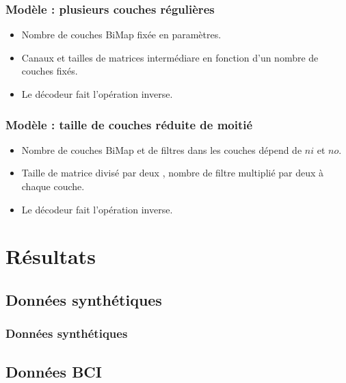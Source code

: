\documentclass{beamer}
\begin{document}
\begin{frame}
\frametitle{Modèle : plusieurs couches régulières}
\begin{itemize}
    \item Nombre de couches BiMap fixée en paramètres.
    \item Canaux et tailles de matrices intermédiare en fonction d'un nombre de couches fixés.
    \item Le décodeur fait l'opération inverse.
\end{itemize}
\begin{center}
    {\tiny
    
    }
\end{center}
\end{frame}

\begin{frame}
\frametitle{Modèle : taille de couches réduite de moitié}
\begin{itemize}
    \item Nombre de couches BiMap et de filtres dans les couches dépend de $ni$ et $no$.
    \item Taille de matrice divisé par deux , nombre de filtre multiplié par deux à chaque couche.
    \item Le décodeur fait l'opération inverse.
\end{itemize}
\begin{center}
    {\tiny
    
    }
\end{center}

\end{frame}





\section{Résultats}

\subsection{Données synthétiques}
\begin{frame}
\frametitle{Données synthétiques}

\end{frame}

\subsection{Données BCI}
\end{document}
